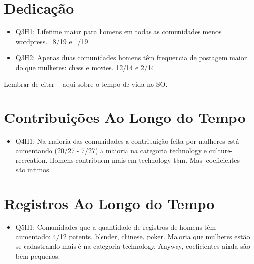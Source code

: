 
\section{Dedicação}%
\label{sec:dedicacao}

\begin{itemize}
	\item Q3H1: Lifetime maior para homens em todas as comunidades menos wordpress. 18/19 e 1/19
	\item Q3H2: Apenas duas comunidades homens têm frequencia de postagem maior do que mulheres: chess e movies. 12/14 e 2/14
\end{itemize}

Lembrar de citar ~\cite{Vasilescu27092013} aqui sobre o tempo de vida no SO.


\section{Contribuições Ao Longo do Tempo}%
\label{sec:tempo}

\begin{itemize}
	\item Q4H1: Na maioria das comunidades a contribuição feita por mulheres está aumentando (20/27 - 7/27) a maioria na categoria technology e culture-recreation. Homens contribuem mais em technology tbm. Mas, coeficientes são ínfimos. 
\end{itemize}


\section{Registros Ao Longo do Tempo}%
\label{sec:registros}

\begin{itemize}
	\item Q5H1: Comunidades que a quantidade de registros de homens têm aumentado: 4/12 patents, blender, chinese, poker. Maioria que mulheres estão se cadastrando mais é na categoria technology. Anyway, coeficientes ainda são bem pequenos.
\end{itemize}

